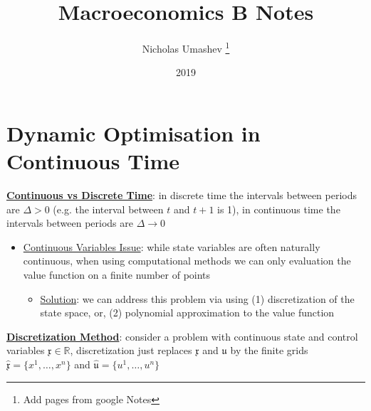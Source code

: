 \documentclass{article}
\title{Macroeconomics B Notes}
\author{Nicholas Umashev \footnote{Add pages from google Notes}}
\date{2019}
\begin{document}
\maketitle

\tableofcontents

\newpage

\section{Dynamic Optimisation in Continuous Time}

\par \underline{\bf{Continuous vs Discrete Time}}: in discrete time the intervals between periods are $\Delta>0$ (e.g. the interval between $t$ and $t+1$ is 1), in continuous time the intervals between periods are $\Delta \rightarrow 0$
\begin{itemize}
    \item  \underline{Continuous Variables Issue}: while state variables are often naturally continuous, when using computational methods we can only evaluation the value function  on a finite number of points
    \begin{itemize}
        \item \underline{Solution}: we can address this problem via using (1) discretization of the state space, or, (2) polynomial approximation to the value function
    \end{itemize}
\end{itemize}
\vspace{2.5mm}
\par \underline{\bf{Discretization Method}}: consider a problem with continuous state and control variables $\mathfrak{x} \in \mathbb{R}$, discretization just replaces $\mathfrak{x}$ and $\mathfrak{u}$ by the finite grids $\widehat{\mathfrak{x}} = \{ x^{1}, \dots, x^{n} \}$ and $\widehat{\mathfrak{u}} = \{ u^{1}, \dots, u^{n} \}$
\end{document}

